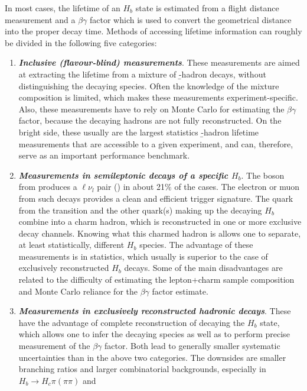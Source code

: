 In most cases, the lifetime of an $H_b$ state is estimated from a flight
distance measurement
and a $\beta\gamma$ factor which is used to convert the geometrical
distance into the proper decay time.  Methods of accessing lifetime
information can roughly be divided in the following five categories:
\begin{enumerate}
\item {\bf\em Inclusive (flavour-blind) measurements}.  These
  measurements are aimed at extracting the lifetime from a mixture of
  \b-hadron decays, without distinguishing the decaying species.  Often
  the knowledge of the mixture composition is limited, which makes these
  measurements experiment-specific.  Also, these
  measurements have to rely on Monte Carlo for estimating the
  $\beta\gamma$ factor, because the decaying hadrons are not fully
  reconstructed.  On the bright side, these usually are the largest
  statistics \b-hadron lifetime measurements that are accessible to a
  given experiment, and can, therefore, serve as an important
  performance benchmark.
\item {\bf\em Measurements in semileptonic decays of a specific
  {\boldmath $H_b$\unboldmath}}.  The  boson from 
  produces a $\ell\nu_l$ pair () in about 21\% of the
  cases.  The electron or muon from such decays provides a clean and efficient
  trigger signature.
  The  quark from the  transition and the other
  quark(s) making up the decaying $H_b$ combine into a charm hadron,
  which is reconstructed in one or more exclusive decay channels.
  Knowing what this charmed hadron is allows one to separate, at least
  statistically, different $H_b$ species.  The advantage of these
  measurements is in statistics, which usually is superior to the case of
  exclusively reconstructed $H_b$ decays.  Some of the main
  disadvantages are related to the difficulty of estimating the lepton+charm
  sample composition and Monte Carlo reliance for the $\beta\gamma$
  factor estimate.
\item {\bf\em Measurements in exclusively reconstructed hadronic decays}.
  These
  have the advantage of complete reconstruction of decaying the $H_b$ state, 
  which allows one to infer the decaying species as well as to perform precise
  measurement of the $\beta\gamma$ factor.  Both lead to generally
  smaller systematic uncertainties than in the above two categories.
  The downsides are smaller branching ratios and larger combinatorial
  backgrounds, especially in $H_b\rightarrow H_c\pi(\pi\pi)$ and

\end{enumerate}
